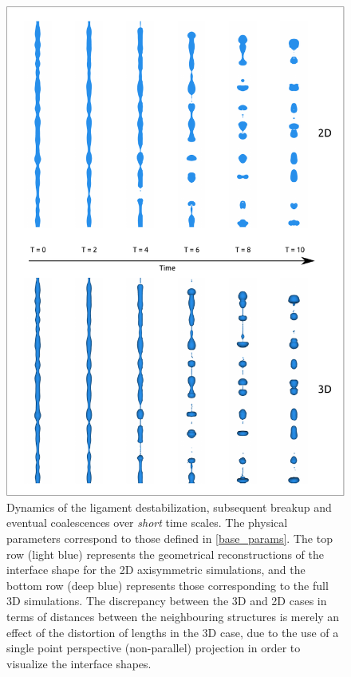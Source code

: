 \begin{figure}
\centering
\includegraphics{plots/ligament_breakup/3d_vs_2d_short.pdf}
	\caption{Dynamics of the ligament destabilization, subsequent breakup 
	and eventual coalescences over \textit{short} time scales. 
	The physical parameters correspond to those defined in \eqref{base_params}.
	The top row (light blue) represents the geometrical reconstructions of 
	the interface shape for the 2D axisymmetric simulations, and the bottom 
	row (deep blue) represents those corresponding to the full 3D simulations.
	The discrepancy between the 3D and 2D cases in terms of distances between
	the neighbouring structures is merely an effect of the distortion of lengths
	in the 3D case, due to the use of a single point perspective (non-parallel) 
	projection in order to visualize the interface shapes. 
	}
\label{2d_3d_short}
\end{figure}

